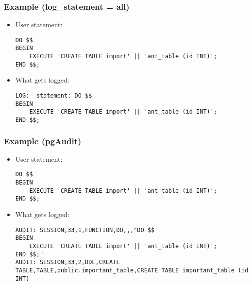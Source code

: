 \begin{frame}[fragile]
    \frametitle{Example (log\_statement = all)}

    \begin{itemize}
        \item User statement:

    \vspace{.75em}\begin{lstlisting}
DO $$
BEGIN
    EXECUTE 'CREATE TABLE import' || 'ant_table (id INT)';
END $$;
    \end{lstlisting}\pause\vspace{1em}

        \item What gets logged:

    \vspace{.75em}\begin{lstlisting}
LOG:  statement: DO $$
BEGIN
    EXECUTE 'CREATE TABLE import' || 'ant_table (id INT)';
END $$; 
    \end{lstlisting}\pause\vspace{1em}

    \end{itemize}
\end{frame}

\begin{frame}[fragile]
    \frametitle{Example (pgAudit)}

    \begin{itemize}
        \item User statement:

    \vspace{.75em}\begin{lstlisting}
DO $$
BEGIN
    EXECUTE 'CREATE TABLE import' || 'ant_table (id INT)';
END $$;
    \end{lstlisting}\pause\vspace{1em}

        \item What gets logged:

    \vspace{.75em}\begin{lstlisting}
AUDIT: SESSION,33,1,FUNCTION,DO,,,"DO $$
BEGIN
    EXECUTE 'CREATE TABLE import' || 'ant_table (id INT)';
END $$;"
AUDIT: SESSION,33,2,DDL,CREATE TABLE,TABLE,public.important_table,CREATE TABLE important_table (id INT)
    \end{lstlisting}\pause\vspace{1em}

    \end{itemize}
\end{frame}

